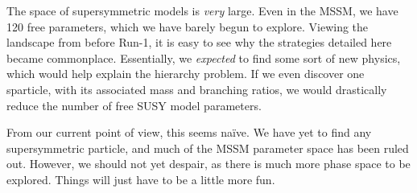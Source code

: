 The space of supersymmetric models is \textit{very} large.
Even in the MSSM, we have 120 free parameters, which we have barely begun to explore.
Viewing the landscape from before Run-1, it is easy to see why the strategies detailed here became commonplace.
Essentially, we \textit{expected} to find some sort of new physics, which would help explain the hierarchy problem.
If we even discover one sparticle, with its associated mass and branching ratios, we would drastically reduce the number of free SUSY model parameters.

From our current point of view, this seems na{\"i}ve.
We have yet to find any supersymmetric particle, and much of the MSSM parameter space has been ruled out.
However, we should not yet despair, as there is much more phase space to be explored.
Things will just have to be a little more fun.

